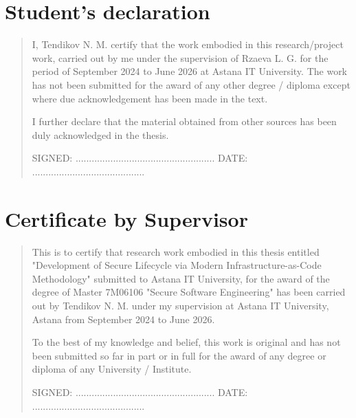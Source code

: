 \chapter{Student's declaration}
\begin{SingleSpace}
\begin{quote}
I, Tendikov N. M. certify that the work embodied in this research/project work, carried out by me under the supervision of Rzaeva L. G. for the period of September 2024 to June 2026 at Astana IT University. The work has not been submitted for the award of any other degree / diploma except where due acknowledgement has been made in the text.

I further declare that the material obtained from other sources has been duly acknowledged in the thesis.

\vspace{1.5cm}
\noindent
\hspace{-0.75cm}\textsc{SIGNED: .................................................... DATE: ..........................................}

\end{quote}
\end{SingleSpace}
\chapter{Certificate by Supervisor}
\begin{SingleSpace}
\begin{quote}
This is to certify that research work embodied in this thesis entitled "Development of Secure Lifecycle via Modern Infrastructure-as-Code Methodology" submitted to Astana IT University, for the award of the degree of Master 7M06106 "Secure Software Engineering" has been carried out by Tendikov N. M. under my supervision at Astana IT University, Astana from September 2024 to June 2026.

To the best of my knowledge and belief, this work is original and has not been submitted so far in part or in full for the award of any degree or diploma of any University / Institute.

\vspace{1.5cm}
\noindent
\hspace{-0.75cm}\textsc{SIGNED: .................................................... DATE: ..........................................}

\end{quote}
\end{SingleSpace}
\clearpage
